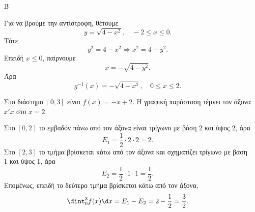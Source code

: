 \begin{thema}{Β}
\begin{erwthma}
Για να βρούμε την αντίστροφη, θέτουμε
\[
y=\sqrt{4-x^2},\quad -2\leq x\leq 0.
\]
Τότε
\[
y^2=4-x^2\Rightarrow x^2=4-y^2.
\]
Επειδή $x\leq 0$, παίρνουμε
\[
x=-\sqrt{4-y^2}.
\]
Άρα
\[
g^{-1}(x)=-\sqrt{4-x^2},\quad 0\leq x\leq 2.
\]

\item Στο διάστημα $[0,3]$ είναι $f(x)=-x+2$. Η γραφική παράσταση τέμνει τον άξονα $x'x$ στο $x=2$.

Στο $[0,2]$ το εμβαδόν πάνω από τον άξονα είναι τρίγωνο με βάση $2$ και ύψος $2$, άρα
\[
E_1=\frac{1}{2}\cdot 2\cdot 2=2.
\]
Στο $[2,3]$ το τμήμα βρίσκεται κάτω από τον άξονα και σχηματίζει τρίγωνο με βάση $1$ και ύψος $1$, άρα
\[
E_2=\frac{1}{2}\cdot 1\cdot 1=\frac{1}{2}.
\]
Επομένως, επειδή το δεύτερο τμήμα βρίσκεται κάτω από τον άξονα,
\[
\dint_{0}^{3}f(x)\d x=E_1-E_2=2-\frac{1}{2}=\frac{3}{2}.
\]
\end{erwthma}
\end{thema}


